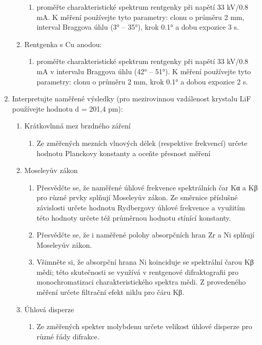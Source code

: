 \documentclass[10pt,a4paper]{article}
\newcommand{\°}{\degree}
\begin{document}
\begin{enumerate}
\begin{enumerate}
        \begin{enumerate}
            \item proměřte charakteristické spektrum rentgenky při napětí 33 kV/0.8 mA. K měření používejte tyto parametry: clonu o průměru 2  mm, interval Braggova úhlu (3° – 35°), krok 0.1° a dobu expozice 3 s.
        \end{enumerate}
        \item Rentgenka s Cu anodou:
        \begin{enumerate}
            \item proměřte charakteristické spektrum rentgenky při napětí 33 kV/0.8 mA v intervalu Braggova úhlu (42° – 51°). K měření používejte tyto parametry: clonu o průměru 2 mm, krok 0.1° a dobou expozice 2 s.
        \end{enumerate}
    \end{enumerate}
    \item Interpretujte naměřené výsledky (pro mezirovinnou vzdálenost krystalu LiF používejte hodnotu d = 201,4 pm):
    \begin{enumerate}
        \item Krátkovlnná mez brzdného záření
        \begin{enumerate}
            \item Ze změřených mezních vlnových délek (respektive frekvencí) určete hodnotu Planckovy konstanty a oceňte přesnost měření
        \end{enumerate}
        \item Moseleyův zákon
        \begin{enumerate}
            \item Přesvědčte se, že naměřené úhlové frekvence spektrálních čar Kα a Kβ pro různé prvky splňují Moseleyův zákon. Ze směrnice příslušné závislosti určete hodnotu Rydbergovy úhlové frekvence a využitím této hodnoty určete též průměrnou hodnotu stínící konstanty.
            \item Přesvědčte se, že i naměřené polohy absorpčních hran Zr a Ni splňují Moseleyův zákon.
            \item Všimněte si, že absorpční hrana Ni koinciduje se spektrální čarou Kβ mědi; této skutečnosti se využívá v rentgenové difraktografii pro monochromatizaci charakteristického spektra mědi. Z provedeného měření určete filtrační efekt niklu pro čáru Kβ.
        \end{enumerate}
        \item Úhlová disperze
        \begin{enumerate}
            \item Ze změřených spekter molybdenu určete velikost úhlové disperze pro různé řády difrakce.
        \end{enumerate}
    \end{enumerate}
\end{enumerate}
\end{document}
